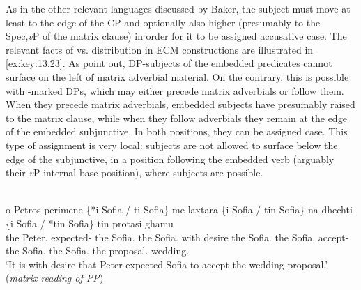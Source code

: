 \documentclass[output=paper]{langsci/langscibook}
\begin{document}
\ea%
    \label{ex:key:13.22}
    \z
\z

As in the other relevant languages discussed by Baker, the subject must move at
least to the edge of the CP and optionally also higher (presumably to the
Spec,\emph{v}P of the matrix clause) in order for it to be assigned accusative
case.  The relevant facts of \Acc{} vs. \Nom{} distribution in  ECM
constructions are illustrated in \eqref{ex:key:13.23}. As \citet{KotzPapa2007} point
out, \Nom{} DP-subjects of the embedded predicates cannot surface on the left of
matrix adverbial material. On the contrary, this is possible with \Acc{}-marked
DPs, which may either precede matrix adverbials or follow them. When they
precede matrix adverbials, embedded \Acc{} subjects have presumably raised to the
matrix clause, while when they follow adverbials they remain at the edge of the
embedded subjunctive. In both positions, they can be assigned \Acc{} case. This
type of \Acc{} assignment is very local: \Acc{} subjects are not allowed to
surface below the edge of the subjunctive, in a position following the embedded
verb (arguably their \emph{v}P internal base position), where \Nom{} subjects are
possible.

\ea%
\label{ex:key:13.23}\\
    \gll o Petros perimene \{*i Sofia / ti Sofia\} me laxtara \{i Sofia / tin Sofia\} na dhechti \{i Sofia / *tin Sofia\} tin protasi ghamu \\
    the Peter.\Nom{} expected-\Tsg{} \hphantom{\{*}the Sofia.\textbf{\Nom{}} {}
        the Sofia.\textbf{\Acc{}} with desire \hphantom{\{}the
            Sofia.\textbf{\Nom} {} the Sofia.\textbf{\Acc} \Sbjv{} accept-\Tsg{}
            \hphantom{\{}the Sofia.\textbf{\Nom} {} \hphantom{*}the
                Sofia.\textbf{\Acc} the proposal.\Acc{} wedding.\Gen{}\\
    \glt    \enquote*{It is with desire that Peter expected Sofia to accept the wedding proposal.} (\emph{matrix reading of PP})
\z
\end{document}
